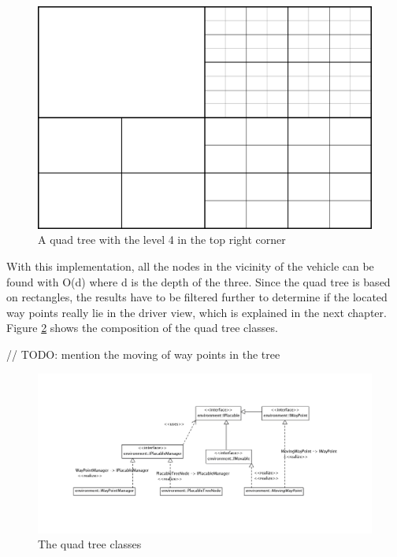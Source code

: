 \begin{figure}[H]
\begin{center}
\includegraphics[scale=0.5]{images/quadtree.png}
\end{center}
\caption{A quad tree with the level 4 in the top right corner}
\label{fig:quadTree}
\end{figure}

\noindent With this implementation, all the nodes in the vicinity of the vehicle can be
found with O(d) where d is the depth of the three. Since the quad tree is based
on rectangles, the results have to be filtered further to determine if the located
way points really lie in the driver view, which is explained in the next 
chapter.\\

\noindent Figure \ref{fig:quadTreeClasses} shows the composition of the quad tree classes.

// TODO: mention the moving of way points in the tree

\begin{figure}[H]
\begin{center}
\includegraphics[width=\textwidth]{images/waypointsmanager.png}
\end{center}
\caption{The quad tree classes}
\label{fig:quadTreeClasses}
\end{figure}

